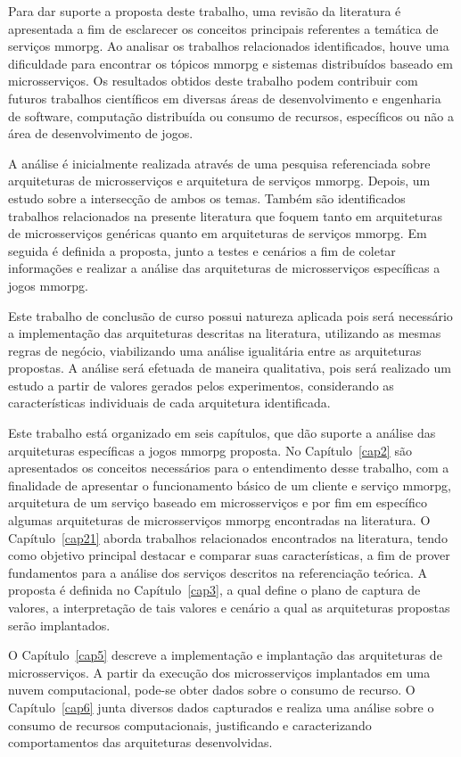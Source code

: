 Para dar suporte a proposta deste trabalho, uma revisão da literatura é apresentada a fim de esclarecer os conceitos principais referentes a temática de serviços \ac{mmorpg}.
%
Ao analisar os trabalhos relacionados identificados, houve uma dificuldade para encontrar os tópicos \ac{mmorpg} e sistemas distribuídos baseado em microsserviços.
%
Os resultados obtidos deste trabalho podem contribuir com futuros trabalhos científicos em diversas áreas de desenvolvimento e engenharia de software, computação distribuída ou consumo de recursos, específicos ou não a área de desenvolvimento de jogos.



A análise é inicialmente realizada através de uma pesquisa referenciada sobre arquiteturas de microsserviços e arquitetura de serviços \ac{mmorpg}.
%
Depois, um estudo sobre a intersecção de ambos os temas.
%
Também são identificados trabalhos relacionados na presente literatura que foquem tanto em arquiteturas de  microsserviços genéricas quanto em arquiteturas de serviços \ac{mmorpg}.
%
Em seguida é definida a proposta, junto a testes e cenários a fim de coletar informações e realizar a análise das arquiteturas de microsserviços específicas a jogos \ac{mmorpg}. 



Este trabalho de conclusão de curso possui natureza aplicada pois será necessário a implementação das arquiteturas descritas na literatura, utilizando as mesmas regras de negócio, viabilizando uma análise igualitária entre as arquiteturas propostas.
%
A análise será efetuada de maneira qualitativa, pois será realizado um estudo a partir de valores gerados pelos experimentos, considerando as características individuais de cada arquitetura identificada.

Este trabalho está organizado em seis capítulos, que dão suporte a análise das arquiteturas específicas a jogos \ac{mmorpg} proposta.
%
No Capítulo~\ref{cap2} são apresentados os conceitos necessários para o entendimento desse trabalho, com a finalidade de apresentar o funcionamento básico de um cliente e serviço \ac{mmorpg}, arquitetura de um serviço baseado em microsserviços e por fim em específico algumas arquiteturas de microsserviços \ac{mmorpg} encontradas na literatura.
%
O Capítulo~\ref{cap21} aborda trabalhos relacionados encontrados na literatura, tendo como objetivo principal destacar e comparar suas características, a fim de prover fundamentos para a análise dos serviços descritos na referenciação teórica.
%
A proposta é definida no Capítulo~\ref{cap3}, a qual define o plano de captura de valores, a interpretação de tais valores e cenário a qual as arquiteturas propostas serão implantados.

O Capítulo~\ref{cap5} descreve a implementação e implantação das arquiteturas de microsserviços.
%
A partir da execução dos microsserviços implantados em uma nuvem computacional, pode-se obter dados sobre o consumo de recurso.
%
O Capítulo~\ref{cap6} junta diversos dados capturados e realiza uma análise sobre o consumo de recursos computacionais, justificando e caracterizando comportamentos das arquiteturas desenvolvidas.


